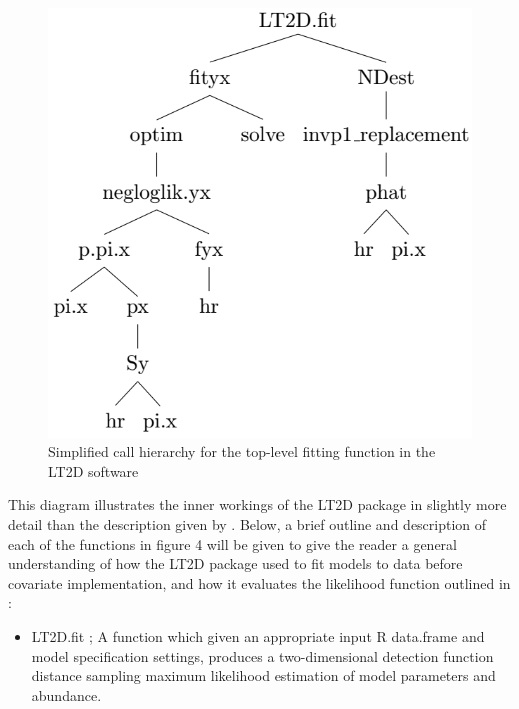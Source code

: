 \documentclass[11pt]{article}
\begin{document}
\begin{multicols}{2}
\begin{figure}[H]
\centering
\includegraphics[scale=0.507]{LT2Dprecov}
\caption{Simplified call hierarchy for the top-level fitting function in the LT2D software}
\end{figure}
This diagram illustrates the inner workings of the LT2D package in slightly more detail than the description given by \cite{Borchers}. Below, a brief outline and description of each of the functions in figure 4 will be given to give the reader a general understanding of how the LT2D package used to fit models to data before covariate implementation, and how it evaluates the likelihood function outlined in \cite{Borchers}:

\begin{itemize}
\item LT2D.fit ; A function which given an appropriate input R data.frame and model specification settings, produces a two-dimensional detection function distance sampling maximum likelihood estimation of model parameters and abundance.


\end{itemize}
\end{multicols}
\end{document}
